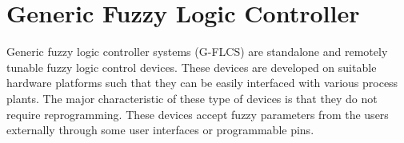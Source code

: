 \section{Generic Fuzzy Logic Controller}
Generic fuzzy logic controller systems (G\hyp{}FLCS) are standalone and remotely tunable fuzzy logic control devices. These devices are developed on suitable hardware platforms such that they can be easily interfaced with various process plants. The major characteristic of these type of devices is that they do not require reprogramming. These devices accept fuzzy parameters from the users externally through some user interfaces or programmable pins.

\begin{table}[h!]
	\centering
	\caption{Important works on G\hyp{}FLCS}
	\label{tab:survey}
\end{table}
